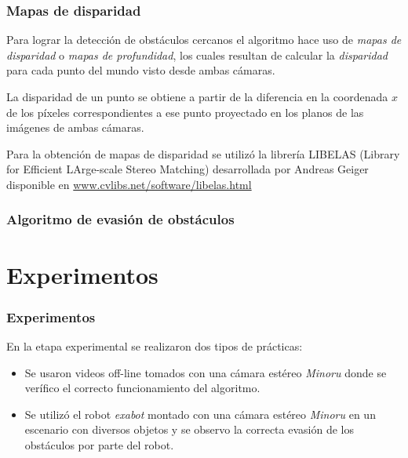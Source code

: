 \documentclass[svgnames]{beamer}
\begin{document}
\begin{frame}
\frametitle{Mapas de disparidad}
Para lograr la detecci\'on de obst\'aculos cercanos el algoritmo hace uso de \emph{mapas de disparidad} o \emph{mapas de profundidad}, los cuales resultan de calcular la \emph{disparidad} para cada punto del mundo visto desde ambas c\'amaras.

La disparidad de un punto se obtiene a partir de la diferencia en la coordenada $x$ de los p\'ixeles correspondientes a ese punto proyectado en los planos de las im\'agenes de ambas c\'amaras.

Para la obtenci\'on de mapas de disparidad se utiliz\'o la librer\'ia LIBELAS (Library for Efficient LArge-scale Stereo Matching) desarrollada por Andreas Geiger disponible en \url{www.cvlibs.net/software/libelas.html}
\end{frame}



%
%

\begin{frame}
\frametitle{Algoritmo de evasi\'on de obst\'aculos}


\end{frame}

\section{Experimentos}

\begin{frame}
\frametitle{Experimentos}
En la etapa experimental se realizaron dos tipos de pr\'acticas:
\begin{itemize}
	\item Se usaron videos off-line tomados con una c\'amara est\'ereo \emph{Minoru} donde se ver\'ifico el correcto funcionamiento del algoritmo.
	\item Se utiliz\'o el robot \emph{exabot} montado con una c\'amara est\'ereo \emph{Minoru} en un escenario con diversos objetos y se observo la correcta evasi\'on de los obst\'aculos por parte del robot.
\end{itemize}



\end{frame}
\end{document}

